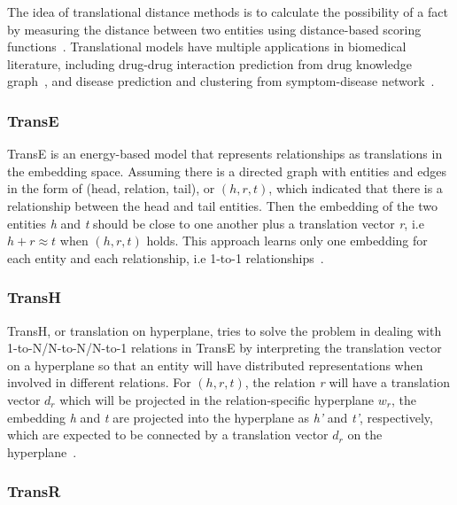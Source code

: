 The idea of translational distance methods is to calculate the possibility of a fact by measuring the distance between two entities using distance-based scoring functions~\cite{wang_knowledge_2017}.
Translational models have multiple applications in biomedical literature, including drug-drug interaction prediction from drug knowledge graph~\cite{abdelaziz_large-scale_2017, wang_predicting_2017}, and disease prediction and clustering from symptom-disease network~\cite{zhao_contextcare:_2017}.

\subsubsection{TransE}

TransE is an energy-based model that represents relationships as translations in the embedding space.
Assuming there is a directed graph with entities and edges in the form of (head, relation, tail), or $(h, r, t)$, which indicated that there is a relationship between the head and tail entities.
Then the embedding of the two entities \textit{h} and \textit{t} should be close to one another plus a translation vector \textit{r}, i.e $h + r \approx t$ when $(h, r, t)$ holds.
This approach learns only one embedding for each entity and each relationship, i.e 1-to-1 relationships~\cite{bordes_translating_2013}.

\subsubsection{TransH}
TransH, or translation on hyperplane, tries to solve the problem in dealing with 1-to-N/N-to-N/N-to-1 relations in TransE by interpreting the translation vector on a hyperplane so that an entity will have distributed representations when involved in different relations.
For $(h, r, t)$, the relation \textit{r} will have a translation vector $d_{r}$ which will be projected in the relation-specific hyperplane $w_{r}$, the embedding \textit{h} and \textit{t} are projected into the hyperplane as \textit{h’} and \textit{t’}, respectively, which are expected to be connected by a translation vector $d_{r}$ on the hyperplane~\cite{wang_knowledge_2014}.

\subsubsection{TransR}

